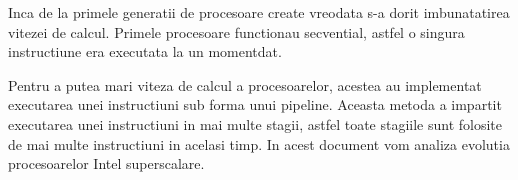 Inca de la primele generatii de procesoare create vreodata s-a dorit imbunatatirea vitezei de
calcul. Primele procesoare functionau secvential, astfel o singura instructiune era executata la un
momentdat.

Pentru a putea mari viteza de calcul a procesoarelor, acestea au implementat executarea unei
instructiuni sub forma unui pipeline. Aceasta metoda a impartit executarea unei instructiuni in mai
multe stagii, astfel toate stagiile sunt folosite de mai multe instructiuni in acelasi timp. In
acest document vom analiza evolutia procesoarelor Intel superscalare. 

